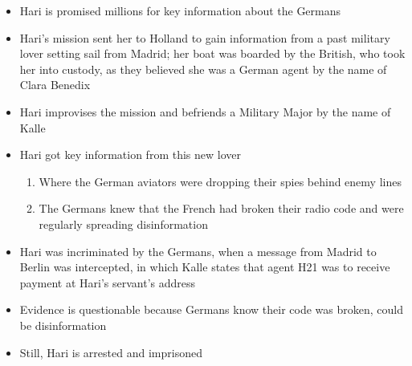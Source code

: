 \begin{itemize}
\begin{itemize}
      \item Hari is promised millions for key information about the Germans

      \item Hari's mission sent her to Holland to gain information from a past military lover setting sail from Madrid; her boat was boarded by the British, who took her into custody, as they believed she was a German agent by the name of Clara Benedix

      \item Hari improvises the mission and befriends a Military Major by the name of Kalle

      \item Hari got key information from this new lover

        \begin{enumerate}

          \item Where the German aviators were dropping their spies behind enemy lines

          \item The Germans knew that the French had broken their radio code and were regularly spreading disinformation
            
        \end{enumerate}

      \item Hari was incriminated by the Germans, when a message from Madrid to Berlin was intercepted, in which Kalle states that agent H21 was to receive payment at Hari's servant's address

      \item Evidence is questionable because Germans know their code was broken, could be disinformation

      \item Still, Hari is arrested and imprisoned

    \end{itemize}

\end{itemize}



